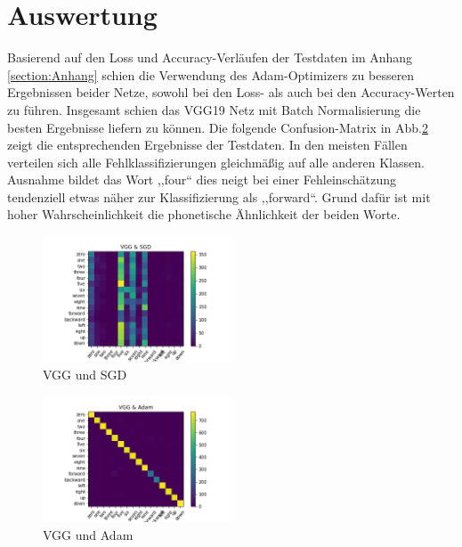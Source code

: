 \documentclass[sigconf]{acmart}
\begin{document}
\section{Auswertung}
Basierend auf den Loss und Accuracy-Verläufen der Testdaten im Anhang \ref{section:Anhang} schien die Verwendung des Adam-Optimizers zu besseren Ergebnissen beider Netze, sowohl bei den Loss- als auch bei den Accuracy-Werten zu führen. Insgesamt schien das VGG19 Netz mit Batch Normalisierung die besten Ergebnisse liefern zu können.  
\newline
\newline
Die folgende Confusion-Matrix in Abb.\ref{fig:Confusion-Matrix_VGG_Adam} zeigt die entsprechenden Ergebnisse der Testdaten. In den meisten Fällen verteilen sich alle Fehlklassifizierungen gleichmäßig auf alle anderen Klassen. Ausnahme bildet das Wort ,,four“ dies neigt bei einer Fehleinschätzung tendenziell etwas näher zur Klassifizierung als ,,forward“. Grund dafür ist mit hoher Wahrscheinlichkeit die phonetische Ähnlichkeit der beiden Worte.

\begin{figure}[ht]
  \includegraphics[width=0.5\textwidth]{images/Confusion-Matrix_VGG_SGD}
  \caption{VGG und SGD}
  \Description{}
  \label{fig:Confusion-Matrix_VGG_SGD}
\end{figure} 

\begin{figure}[ht]
  \includegraphics[width=0.5\textwidth]{images/Confusion-Matrix_VGG_Adam}
  \caption{VGG und Adam}
  \Description{}
  \label{fig:Confusion-Matrix_VGG_Adam}
\end{figure} 
\end{document}
